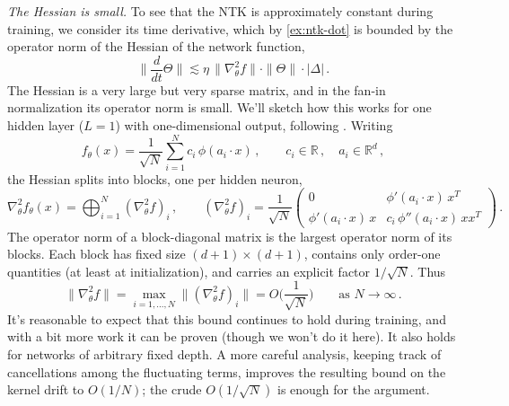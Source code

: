 \documentclass[11pt]{article}
\newcommand{\R}{\mathbb{R}}
\begin{document}
\emph{The Hessian is small.} To see that the NTK is approximately constant during training, we consider its time derivative, which by \cref{ex:ntk-dot} is bounded by the operator norm of the Hessian of the network function,
%
\begin{equation} \label{NTKdot-bound}
    \Big\|\frac{d}{dt}\Theta\Big\| \lesssim \eta\, \| \nabla_\theta^2 f \| \cdot \|\Theta\|\cdot|\Delta|\,.
\end{equation}
%
The Hessian is a very large but very sparse matrix, and in the fan-in normalization its operator norm is small. We'll sketch how this works for one hidden layer ($L=1$) with one-dimensional output, following \cite[Lecture 3]{hanin2026mdl}. Writing
%
\begin{equation} \label{L1-net}
    f_\theta(x) = \frac{1}{\sqrt N}\sum_{i=1}^{N} c_i\, \phi(a_i\cdot x)\,,\qquad c_i\in \R\,,\quad a_i\in \R^d\,,
\end{equation}
%
the Hessian splits into blocks, one per hidden neuron,
%
\begin{equation} \label{L1-hessian}
    \nabla_\theta^2 f_\theta(x) = \bigoplus_{i=1}^{N} (\nabla_\theta^2 f)_i\,,\qquad (\nabla_\theta^2 f)_i = \frac{1}{\sqrt N}\begin{pmatrix}
        0 & \phi'(a_i\cdot x)\, x^T \\
        \phi'(a_i\cdot x)\, x & c_i\, \phi''(a_i\cdot x)\, x x^T
    \end{pmatrix}\,.
\end{equation}
%
The operator norm of a block-diagonal matrix is the largest operator norm of its blocks. Each block has fixed size $(d+1)\times(d+1)$, contains only order-one quantities (at least at initialization), and carries an explicit factor $1/\sqrt N$. Thus
%
\begin{equation} \label{hessian-bound}
    \| \nabla_\theta^2 f\| = \max_{i=1,...,N} \| (\nabla_\theta^2 f)_i\| = O\Big(\frac{1}{\sqrt N}\Big)\qquad \text{as $N\to\infty$}\,.
\end{equation}
%
It's reasonable to expect that this bound continues to hold during training, and with a bit more work it can be proven (though we won't do it here). It also holds for networks of arbitrary fixed depth. A more careful analysis, keeping track of cancellations among the fluctuating terms, improves the resulting bound on the kernel drift to $O(1/N)$; the crude $O(1/\sqrt N)$ is enough for the argument.
\end{document}
